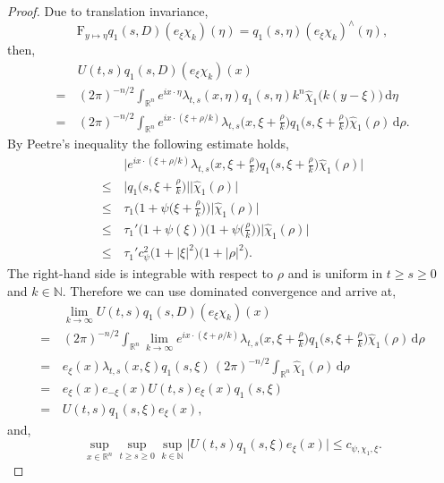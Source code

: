 \documentclass[a4paper, 12pt]{report}
\theoremstyle{cor}
\theoremstyle{remark}
\theoremstyle{definition}
\begin{document}
\begin{proof}
Due to translation invariance,
$$
\mathrm{F}_{y \mapsto \eta}q_1(s, D)(e_\xi\chi_k)(\eta) = q_1(s, \eta)(e_\xi\chi_k)^\wedge(\eta),
$$
then,
$$
\begin{aligned}
& \, U(t, s)q_1(s, D)(e_\xi\chi_k)(x)\\
= & \, (2\pi)^{-n/2}\int_{\mathbb{R}^n}e^{ix\cdot\eta}\lambda_{t, s}(x, \eta)q_1(s, \eta)k^n\hat{\chi}_1\big(k(y - \xi)\big)\,\mathrm{d}\eta\\
= & \, (2\pi)^{-n/2}\int_{\mathbb{R}^n}e^{ix\cdot(\xi + \rho/k)}\lambda_{t, s}\Big(x, \xi + \frac{\rho}{k}\Big)q_1\Big(s, \xi + \frac{\rho}{k}\Big)\hat{\chi}_1(\rho)\,\mathrm{d}\rho.
\end{aligned}
$$
By Peetre's inequality the following estimate holds,
$$
\begin{aligned}
& \, \bigg|e^{ix\cdot(\xi + \rho/k)}\lambda_{t, s}\Big(x, \xi + \frac{\rho}{k}\Big)q_1\Big(s, \xi + \frac{\rho}{k}\Big)\hat{\chi}_1(\rho)\bigg|\\
\le & \, \bigg|q_1\Big(s, \xi + \frac{\rho}{k}\Big)\bigg|\big|\hat{\chi}_1(\rho)\big|\\
\le & \, \tau_1\bigg(1 + \psi\Big(\xi + \frac{\rho}{k}\Big)\bigg)\big|\hat{\chi}_1(\rho)\big|\\
\le & \, \tau_1'\big(1 + \psi(\xi)\big)\bigg(1 + \psi\Big(\frac{\rho}{k}\Big)\bigg)\big|\hat{\chi}_1(\rho)\big|\\
\le & \, \tau_1'c_\psi^2\big(1 + |\xi|^2\big)\big(1 + |\rho|^2\big).
\end{aligned}
$$
The right-hand side is integrable with respect to $\rho$ and is uniform in $t \ge s \ge 0$ and $k \in \mathbb{N}$.  Therefore we can use dominated convergence and arrive at,
$$
\begin{aligned}
& \, \lim_{k \to \infty}U(t, s)q_1(s, D)(e_\xi\chi_k)(x)\\
= & \, (2\pi)^{-n/2}\int_{\mathbb{R}^n}\lim_{k \to \infty}e^{ix\cdot(\xi + \rho/k)}\lambda_{t, s}\Big(x, \xi + \frac{\rho}{k}\Big)q_1\Big(s, \xi + \frac{\rho}{k}\Big)\hat{\chi}_1(\rho)\,\mathrm{d}\rho\\
= & \, e_\xi(x)\lambda_{t, s}(x, \xi)q_1(s, \xi)\,(2\pi)^{-n/2}\int_{\mathbb{R}^n}\hat{\chi}_1(\rho)\,\mathrm{d}\rho\\
= & \, e_\xi(x)e_{-\xi}(x)U(t, s)e_\xi(x)q_1(s, \xi)\\
= & \, U(t, s)q_1(s, \xi)e_\xi(x),
\end{aligned}
$$
and,
$$
\sup_{x \in \mathbb{R}^n}\sup_{t \ge s \ge 0}\sup_{k \in \mathbb{N}}\big|U(t, s)q_1(s, \xi)e_\xi(x)\big| \le c_{\psi, \chi_1, \xi}.
$$
\end{proof}
\end{document}
